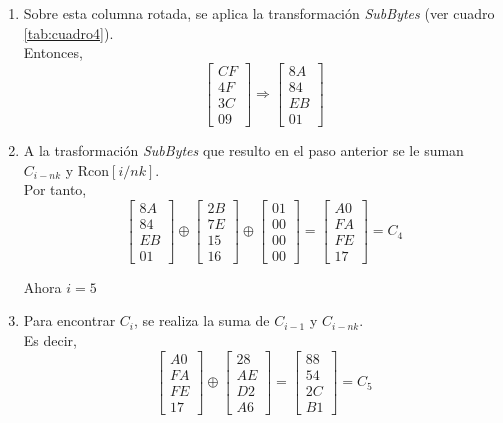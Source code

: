 \documentclass[peerreview]{IEEEtran}
\begin{document}
\begin{enumerate}
\item Sobre esta columna rotada, se aplica la transformación \textit{SubBytes} (ver cuadro \ref{tab:cuadro4}).\\
Entonces,
 \[    \begin{bmatrix}
	CF \\
	4F \\
	3C \\
	09 
\end{bmatrix}\Rightarrow \begin{bmatrix}
	8A \\
	84 \\
	EB \\
	01 
\end{bmatrix} \]
\item A la trasformación \textit{SubBytes} que resulto en el paso anterior se le suman $C_{i-nk}$ y Rcon$[i / nk]$. \\
Por tanto,
\[\begin{bmatrix}
	8A \\
	84 \\
	EB \\
	01 
\end{bmatrix}  \oplus \begin{bmatrix}
	2B \\
	7E \\
	15 \\
	16 
\end{bmatrix} \oplus \begin{bmatrix}
	01 \\
	00 \\
	00 \\
	00 
\end{bmatrix} = \begin{bmatrix}
	A0 \\
	FA \\
	FE \\
	17 
\end{bmatrix} = C_4\]

Ahora $i=5$
 \item Para encontrar $C_i$, se realiza la suma de $C_{i-1}$ y $C_{i-nk}$.\\
 Es decir,
\[ \begin{bmatrix}
	A0 \\
	FA \\
	FE \\
	17 
\end{bmatrix} \oplus \begin{bmatrix}
	28 \\
	AE \\
	D2 \\
	A6 
\end{bmatrix} = \begin{bmatrix}
	88 \\
	54 \\
	2C \\
	B1 
\end{bmatrix} = C_5\]
\end{enumerate}
\end{document}

